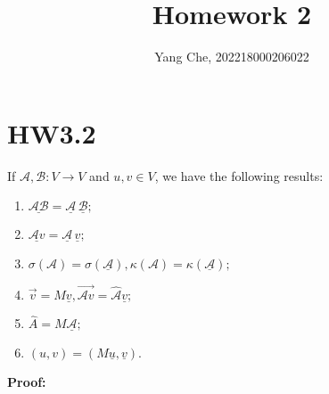 \documentclass{article}
\title{Homework 2} %
\author{Yang Che,  202218000206022} %
\date{} %
\begin{document}

\maketitle %

\section{HW3.2}
If $\mathcal{A},\mathcal{B}:V\to V$ and $u,v\in V$, we have the following results:
\begin{enumerate}[1.]
    \item $\underline{\mathcal{AB}}=\underline{\mathcal{A}}\, \underline{\mathcal{B}};$
    \item $\underline{\mathcal{A}v}=\underline{\mathcal{A}}\, \underline{v};$
    \item $\sigma(\mathcal{A})=\sigma(\underline{\mathcal{A}}),\kappa(\mathcal{A})=\kappa(\underline{\mathcal{A}});$
    \item $\vec{v}=M\underline{v},\overrightarrow{\mathcal{A}v}=\hat{\mathcal{A}}\underline{v};$
    \item $\hat{A}=M\underline{\mathcal{A}};$
    \item $(u,v)=(M\underline{u},\underline{v}).$
\end{enumerate}
\textbf{Proof:}
\end{document}
